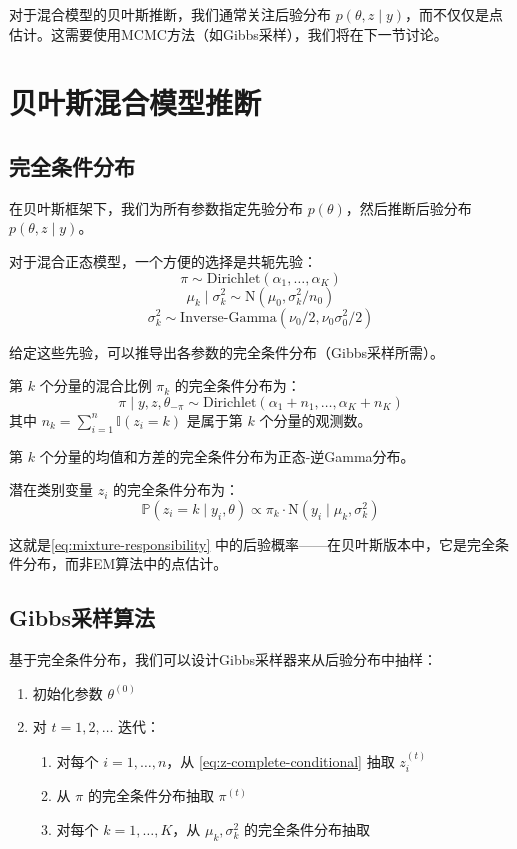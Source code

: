 对于混合模型的贝叶斯推断，我们通常关注后验分布 $p(\theta, z \mid y)$，而不仅仅是点估计。这需要使用MCMC方法（如Gibbs采样），我们将在下一节讨论。

\section{贝叶斯混合模型推断}

\subsection{完全条件分布}

在贝叶斯框架下，我们为所有参数指定先验分布 $p(\theta)$，然后推断后验分布 $p(\theta, z \mid y)$。

对于混合正态模型，一个方便的选择是共轭先验：
\[
\pi \sim \text{Dirichlet}(\alpha_1, \ldots, \alpha_K)
\]
\[
\mu_k \mid \sigma_k^2 \sim \mathrm{N}(\mu_0, \sigma_k^2 / n_0)
\]
\[
\sigma_k^2 \sim \text{Inverse-Gamma}(\nu_0/2, \nu_0 \sigma_0^2/2)
\]

给定这些先验，可以推导出各参数的完全条件分布（Gibbs采样所需）。

第 $k$ 个分量的混合比例 $\pi_k$ 的完全条件分布为：
\[
\pi \mid y, z, \theta_{-\pi} \sim \text{Dirichlet}(\alpha_1 + n_1, \ldots, \alpha_K + n_K)
\]
其中 $n_k = \sum_{i=1}^{n} \mathbb{I}(z_i = k)$ 是属于第 $k$ 个分量的观测数。

第 $k$ 个分量的均值和方差的完全条件分布为正态-逆Gamma分布。

潜在类别变量 $z_i$ 的完全条件分布为：
\[
\mathbb{P}(z_i = k \mid y_i, \theta) \propto \pi_k \cdot \mathrm{N}(y_i \mid \mu_k, \sigma_k^2)
\label{eq:z-complete-conditional}
\]

这就是\cref{eq:mixture-responsibility} 中的后验概率——在贝叶斯版本中，它是完全条件分布，而非EM算法中的点估计。

\subsection{Gibbs采样算法}

基于完全条件分布，我们可以设计Gibbs采样器来从后验分布中抽样：

\begin{enumerate}
  \item 初始化参数 $\theta^{(0)}$
  \item 对 $t = 1, 2, \ldots$ 迭代：
  \begin{enumerate}
    \item 对每个 $i = 1, \ldots, n$，从 \cref{eq:z-complete-conditional} 抽取 $z_i^{(t)}$
    \item 从 $\pi$ 的完全条件分布抽取 $\pi^{(t)}$
    \item 对每个 $k = 1, \ldots, K$，从 $\mu_k, \sigma_k^2$ 的完全条件分布抽取
  \end{enumerate}
\end{enumerate}

